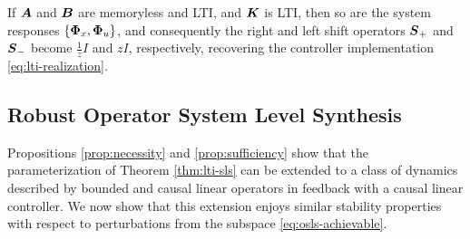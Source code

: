 \begin{remark}
If $\boldsymbol{A}$ and $\boldsymbol{B}$ are memoryless and LTI, and $\boldsymbol{K}$ is LTI, then so are the system responses $\left\{\boldsymbol{\Phi}_x,\boldsymbol{\Phi}_u\right\}$, and consequently the right and left shift operators $\boldsymbol{S}_+$ and $\boldsymbol{S}_-$ become $\frac{1}{z}I$ and $zI$, respectively, recovering the controller implementation \eqref{eq:lti-realization}.
\end{remark}

\subsection{Robust Operator System Level Synthesis}
Propositions \ref{prop:necessity} and \ref{prop:sufficiency} show that the parameterization of Theorem \ref{thm:lti-sls} can be extended to a class of dynamics described by bounded and causal linear operators in feedback with a causal linear controller.  We now show that this extension enjoys similar stability properties with respect to perturbations from the subspace \eqref{eq:osls-achievable}.

